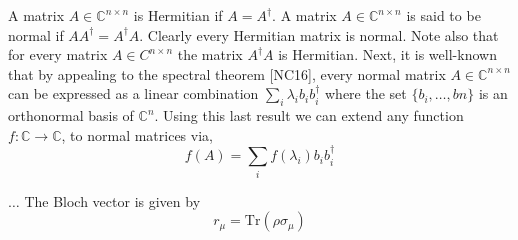 A matrix $A \in  \mathbb{C}^{n\times n}$ is Hermitian if $A = A^{\dag}$.
A matrix $A \in \mathbb{C}^{n\times n}$ is said to be normal if $AA^{\dag} =  A^{\dag}A$. Clearly every Hermitian matrix is normal. Note also that for every matrix $A \in C^{n\times n}$ the matrix $A^{\dag}A$ is Hermitian. Next, it is well-known that by appealing to the spectral theorem [NC16], every normal matrix $A \in  \mathbb{C}^{n\times n}$ can be expressed as a linear combination $\sum_{i} \lambda_{i}b_{i}b_{i}^{\dag}$ where the set $\{b_{i}, \ldots , b{n}\}$ is an orthonormal basis of $\mathbb{C}^{n}$. Using this last result we can extend any function $f:\mathbb{C} \xrightarrow{} \mathbb{C}$, to normal matrices via,
\begin{equation} \label{eq:apply_f_diag}
  f(A) = \sum_{i} f(\lambda_{i})b_{i}b_{i}^{\dag}
\end{equation}

$\ldots$
The Bloch vector is given by 
\begin{equation}
  \label{eq:Bloch_vector}
  r_{\mu} = \text{Tr}(\rho \sigma_{\mu})
  \end{equation}



